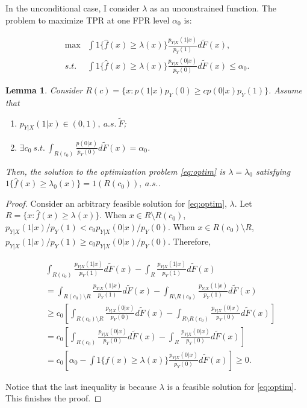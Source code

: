 \documentclass{article} %
\newtheorem{lemma}[theorem]{Lemma}
\begin{document}
In the unconditional case, I consider $\lambda$ as an unconstrained function.  The problem to maximize TPR at one FPR level $\alpha_0$ is:

\begin{equation}\label{eq:optim}
\begin{split}
\max & \int 1\{\hat f(x) \geq \lambda(x)\} \frac{p_{Y|X}(1|x)}{p_Y(1)}d\tilde F(x),\\
s.t. & \int 1\{\hat f(x) \geq \lambda(x)\} \frac{p_{Y|X}(0|x)}{p_Y(0)}d\tilde F(x) \leq \alpha_0.
\end{split}
\end{equation}

\begin{lemma}\label{lm:rank}
Consider $R(c)=\{x:p(1|x)p_Y(0)\geq cp(0|x)p_Y(1)\}$. Assume that 
\begin{enumerate}
\item $p_{Y|X}(1|x)\in (0,1),~a.s. ~\tilde F$;
\item $\exists c_0~s.t.~\int_{R(c_0)}\frac{p(0|x)}{p_Y(0)}d\tilde F(x)=\alpha_0$.
\end{enumerate}
Then, the solution to the optimization problem \ref{eq:optim} is $\lambda=\lambda_0$ satisfying $1\{\hat f(x)\geq \lambda_0(x)\}=1(R(c_0)),~a.s.$.
\end{lemma}

\begin{proof}
Consider an arbitrary feasible solution for \ref{eq:optim}, $\lambda$. Let $R=\{x:\hat f(x)\geq \lambda(x)\}$. When $x\in R\setminus R(c_0)$, $p_{Y|X}(1|x)/p_Y(1)<c_0p_{Y|X}(0|x)/p_Y(0)$. When $x\in R(c_0)\setminus R$, $p_{Y|X}(1|x)/p_Y(1)\geq c_0p_{Y|X}(0|x)/p_Y(0)$. Therefore,

\begin{equation*}
\begin{split}
&\int_{R(c_0)}\frac{p_{Y|X}(1|x)}{p_Y(1)}d\tilde F(x)-\int_{R}\frac{p_{Y|X}(1|x)}{p_Y(1)}d\tilde F(x)\\
&=\int_{R(c_0)\setminus R}\frac{p_{Y|X}(1|x)}{p_Y(1)}d\tilde F(x)-\int_{R\setminus R(c_0)}\frac{p_{Y|X}(1|x)}{p_Y(1)}d\tilde F(x)\\
&\geq c_0[\int_{R(c_0)\setminus R}\frac{p_{Y|X}(0|x)}{p_Y(0)}d\tilde F(x)-\int_{R\setminus R(c_0)}\frac{p_{Y|X}(0|x)}{p_Y(0)}d\tilde F(x)]\\
&= c_0[\int_{R(c_0)}\frac{p_{Y|X}(0|x)}{p_Y(0)}d\tilde F(x)-\int_{R}\frac{p_{Y|X}(0|x)}{p_Y(0)}d\tilde F(x)]\\
&=c_0[\alpha_0-\int1\{\hat f(x) \geq \lambda(x)\}\frac{p_{Y|X}(0|x)}{p_Y(0)}d\tilde F(x)]\geq 0.
\end{split}
\end{equation*}

Notice that the last inequality is because $\lambda$ is a feasible solution for \ref{eq:optim}. This finishes the proof.
\end{proof}
\end{document}
